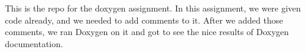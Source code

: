 This is the repo for the doxygen assignment. In this assignment, we were given code already, and we needed to add comments to it. After we added those comments, we ran Doxygen on it and got to see the nice results of Doxygen documentation. 